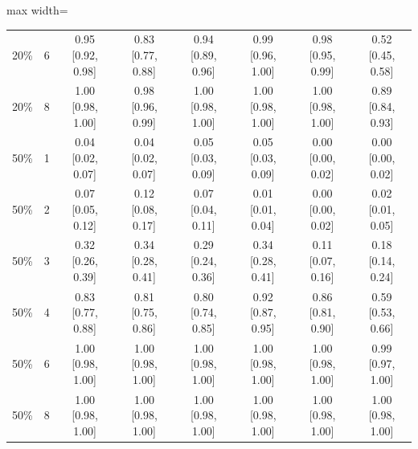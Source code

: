 \begin{table}[htbp]
\begin{adjustbox}{max width=\linewidth}
\begin{tabular}{llcccccc}
20\% & 6 & 0.95 [0.92, 0.98] & 0.83 [0.77, 0.88] & 0.94 [0.89, 0.96] & 0.99 [0.96, 1.00] & 0.98 [0.95, 0.99] & 0.52 [0.45, 0.58] \\
20\% & 8 & 1.00 [0.98, 1.00] & 0.98 [0.96, 0.99] & 1.00 [0.98, 1.00] & 1.00 [0.98, 1.00] & 1.00 [0.98, 1.00] & 0.89 [0.84, 0.93] \\
50\% & 1 & 0.04 [0.02, 0.07] & 0.04 [0.02, 0.07] & 0.05 [0.03, 0.09] & 0.05 [0.03, 0.09] & 0.00 [0.00, 0.02] & 0.00 [0.00, 0.02] \\
50\% & 2 & 0.07 [0.05, 0.12] & 0.12 [0.08, 0.17] & 0.07 [0.04, 0.11] & 0.01 [0.01, 0.04] & 0.00 [0.00, 0.02] & 0.02 [0.01, 0.05] \\
50\% & 3 & 0.32 [0.26, 0.39] & 0.34 [0.28, 0.41] & 0.29 [0.24, 0.36] & 0.34 [0.28, 0.41] & 0.11 [0.07, 0.16] & 0.18 [0.14, 0.24] \\
50\% & 4 & 0.83 [0.77, 0.88] & 0.81 [0.75, 0.86] & 0.80 [0.74, 0.85] & 0.92 [0.87, 0.95] & 0.86 [0.81, 0.90] & 0.59 [0.53, 0.66] \\
50\% & 6 & 1.00 [0.98, 1.00] & 1.00 [0.98, 1.00] & 1.00 [0.98, 1.00] & 1.00 [0.98, 1.00] & 1.00 [0.98, 1.00] & 0.99 [0.97, 1.00] \\
50\% & 8 & 1.00 [0.98, 1.00] & 1.00 [0.98, 1.00] & 1.00 [0.98, 1.00] & 1.00 [0.98, 1.00] & 1.00 [0.98, 1.00] & 1.00 [0.98, 1.00] \\
\bottomrule
\end{tabular}
\end{adjustbox}
\end{table}
